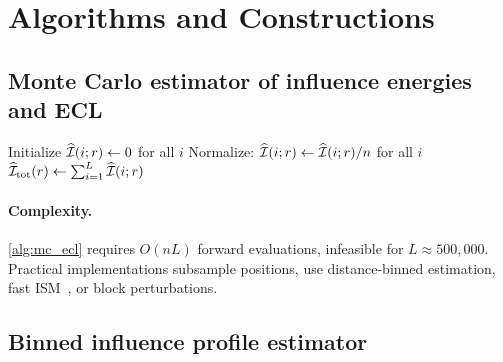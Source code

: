 \section{Algorithms and Constructions}\label{sec:algorithms}

\subsection{Monte Carlo estimator of influence energies and ECL}

\begin{algorithm}[H]
\caption{Monte Carlo estimator of influence energies and ECL}\label{alg:mc_ecl}
\BlankLine
Initialize $\widehat{\mathcal{I}}(i;r)\leftarrow 0$ for all $i$\;
Normalize: $\widehat{\mathcal{I}}(i;r)\leftarrow \widehat{\mathcal{I}}(i;r)/n$ for all $i$\;
$\widehat{\mathcal{I}}_{\mathrm{tot}}(r)\leftarrow \sum_{i=1}^L \widehat{\mathcal{I}}(i;r)$\;
\;
\end{algorithm}

\paragraph{Complexity.}
\cref{alg:mc_ecl} requires $O(nL)$ forward evaluations, infeasible for $L \approx 500{,}000$. Practical implementations subsample positions, use distance-binned estimation, fast ISM~\citep{Nair2022fastISM}, or block perturbations.

\subsection{Binned influence profile estimator}

